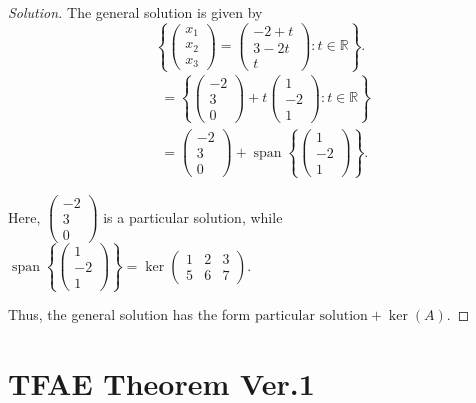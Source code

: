 \documentclass[12pt]{article}
\newenvironment{solution}
{\begin{proof}[Solution]}
{\end{proof}}
\begin{document}
\begin{solution}
The general solution is given by
\[
\left\{
\begin{pmatrix}
x_1\\
x_2\\
x_3
\end{pmatrix}
=
\begin{pmatrix}
-2+t\\
3-2t\\
t
\end{pmatrix}
:t\in\mathbb{R}
\right\}.
\]
\begin{align*}
&=
\left\{
\begin{pmatrix}
-2\\
3\\
0
\end{pmatrix}
+
t
\begin{pmatrix}
1\\
-2\\
1
\end{pmatrix}
:t\in\mathbb{R}
\right\}\\
&=
\begin{pmatrix}
-2\\
3\\
0
\end{pmatrix}
+
\operatorname{span}
\left\{
\begin{pmatrix}
1\\
-2\\
1
\end{pmatrix}
\right\}.
\end{align*}

Here,
$\begin{pmatrix}
-2\\
3\\
0
\end{pmatrix}$ is a particular solution, while
$\operatorname{span}
\left\{
\begin{pmatrix}
1\\
-2\\
1
\end{pmatrix}
\right\}
=\ker
\begin{pmatrix}
1&2&3\\
5&6&7
\end{pmatrix}$.


Thus, the general solution has the form 
$\boxed{
\text{particular solution}+\ker(A)
}$.
\end{solution}

\section{TFAE Theorem Ver.1}
\end{document}
